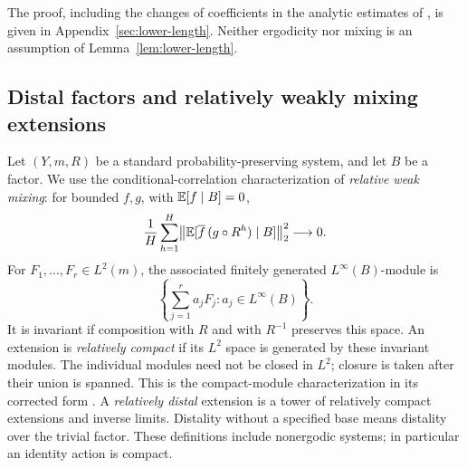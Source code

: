 The proof, including the changes of coefficients in the analytic
estimates of \cite{TripleCompanion,HilbertCompanion}, is given in
Appendix~\ref{sec:lower-length}.  Neither ergodicity nor mixing is an
assumption of Lemma~\ref{lem:lower-length}.

\subsection{Distal factors and relatively weakly mixing extensions}

Let $(Y,m,R)$ be a standard probability-preserving system, and let
$B$ be a factor.  We use the conditional-correlation characterization
of \emph{relative weak mixing}: for bounded $f,g$, with
$\mathbb E[f\mid B]=0$,
\begin{equation}\label{eq:rwm-correlations}
 \frac1H\sum_{h=1}^H
 \bigl\|\mathbb E[\overline f\,(g\circ R^h)\mid B]\bigr\|_2^2
 \longrightarrow0.
\end{equation}
For $F_1,\ldots,F_r\in L^2(m)$, the associated finitely generated
$L^\infty(B)$-module is
\[
 \left\{\sum_{j=1}^r a_j F_j:a_j\in L^\infty(B)\right\}.
\]
It is invariant if composition with $R$ and with $R^{-1}$ preserves
this space.  An extension is \emph{relatively compact} if its $L^2$
space is generated by these invariant modules.
The individual modules need not be closed in $L^2$; closure is taken
after their union is spanned.  This is the compact-module
characterization in its corrected form
\cite[Theorem~4.1]{Jamneshan}\cite[Theorem~2.5]{JamneshanCorrigendum}.
A
\emph{relatively distal} extension is a tower of relatively compact
extensions and inverse limits.  Distality without a specified base
means distality over the trivial factor.  These definitions include
nonergodic systems; in particular an identity action is compact.

